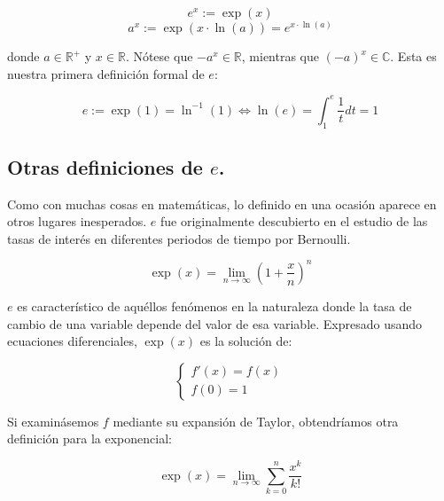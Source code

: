 $$e^x := \exp(x)$$
$$a^x := \exp(x\cdot \ln(a)) = e^{x\cdot \ln(a)}$$

donde $a\in \mathbb{R}^+$ y $x\in \mathbb{R}$. Nótese que $-a^x \in \mathbb{R}$, mientras que $(-a)^x \in \mathbb{C}$. Esta es nuestra primera definición formal de $e$:

$$e := \exp(1) = \ln^{-1}(1) \iff \ln(e) = \int_{1}^{e} \frac{1}{t} dt = 1$$

\subsection{Otras definiciones de $e$.}

Como con muchas cosas en matemáticas, lo definido en una ocasión aparece en otros lugares inesperados. $e$ fue originalmente descubierto en el estudio de las tasas de interés en diferentes periodos de tiempo por Bernoulli.

$$\exp(x) = \lim_{n \to \infty} \left(1 + \frac{x}{n}\right)^n$$

$e$ es característico de aquéllos fenómenos en la naturaleza donde la tasa de cambio de una variable depende del valor de esa variable. Expresado usando ecuaciones diferenciales, $\exp(x)$ es la solución de:

\begin{equation}
	\begin{cases}
		f'(x) = f(x) \\
		f(0) = 1
	\end{cases}
\end{equation}

Si examinásemos $f$ mediante su expansión de Taylor, obtendríamos otra definición para la exponencial:

$$\exp(x) = \lim_{n \to \infty} \sum\limits_{k = 0}^{n} \frac{x^k}{k!}$$

\newpage
